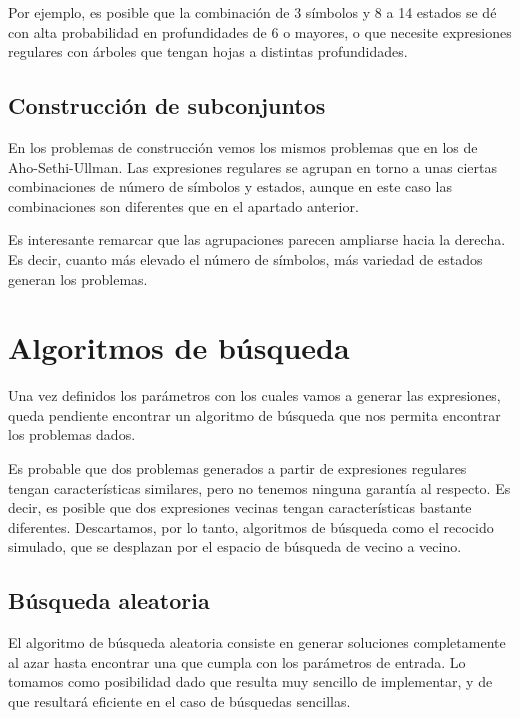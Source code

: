 Por ejemplo, es posible que la combinación de 3 símbolos y 8 a 14 estados se dé con alta probabilidad en profundidades de 6 o mayores, o que necesite expresiones regulares con árboles que tengan hojas a distintas profundidades.

\subsection{Construcción de subconjuntos}

En los problemas de construcción vemos los mismos problemas que en los de Aho-Sethi-Ullman.
Las expresiones regulares se agrupan en torno a unas ciertas combinaciones de número de símbolos y estados, aunque en este caso las combinaciones son diferentes que en el apartado anterior.


Es interesante remarcar que las agrupaciones parecen ampliarse hacia la derecha.
Es decir, cuanto más elevado el número de símbolos, más variedad de estados generan los problemas.

\section{Algoritmos de búsqueda}

Una vez definidos los parámetros con los cuales vamos a generar las expresiones, queda pendiente encontrar un algoritmo de búsqueda que nos permita encontrar los problemas dados.

Es probable que dos problemas generados a partir de expresiones regulares tengan características similares, pero no tenemos ninguna garantía al respecto.
Es decir, es posible que dos expresiones vecinas tengan características bastante diferentes.
Descartamos, por lo tanto, algoritmos de búsqueda como el recocido simulado, que se desplazan por el espacio de búsqueda de vecino a vecino.

\subsection{Búsqueda aleatoria}
El algoritmo de búsqueda aleatoria consiste en generar soluciones completamente al azar hasta encontrar una que cumpla con los parámetros de entrada.
Lo tomamos como posibilidad dado que resulta muy sencillo de implementar, y de que resultará eficiente en el caso de búsquedas sencillas.

